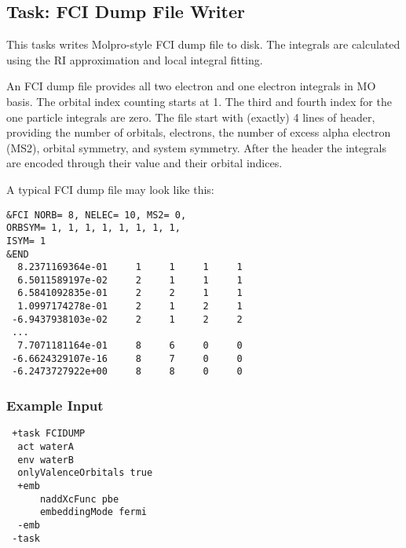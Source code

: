 \subsection{Task: FCI Dump File Writer}\label{sec:tasks:FCIDumpFileWriter}
This tasks writes Molpro-style FCI dump file to disk. The integrals are calculated using the RI approximation and local
integral fitting.

An FCI dump file provides all two electron and one electron integrals in MO basis.
The orbital index counting starts at 1. The third and fourth index for the one
particle integrals are zero. The file start with (exactly) 4 lines of header, providing
the number of orbitals, electrons, the number of excess alpha electron (MS2), orbital
symmetry, and system symmetry. After the header the integrals are encoded through their
value and their orbital indices.

A typical FCI dump file may look like this:
\begin{lstlisting}
&FCI NORB= 8, NELEC= 10, MS2= 0,
ORBSYM= 1, 1, 1, 1, 1, 1, 1, 1,
ISYM= 1
&END
  8.2371169364e-01     1     1     1     1
  6.5011589197e-02     2     1     1     1
  6.5841092835e-01     2     2     1     1
  1.0997174278e-01     2     1     2     1
 -6.9437938103e-02     2     1     2     2
 ...
  7.7071181164e-01     8     6     0     0
 -6.6624329107e-16     8     7     0     0
 -6.2473727922e+00     8     8     0     0
\end{lstlisting}

\subsubsection{Example Input}
\begin{lstlisting}
 +task FCIDUMP
  act waterA
  env waterB
  onlyValenceOrbitals true
  +emb
      naddXcFunc pbe
      embeddingMode fermi
  -emb
 -task
\end{lstlisting}

